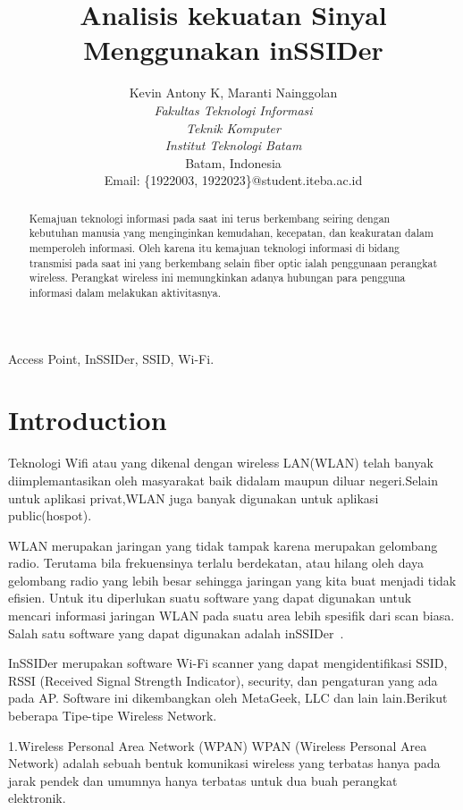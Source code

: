 \documentclass[conference]{IEEEtran}
\title{Analisis kekuatan Sinyal Menggunakan inSSIDer}
\author{Kevin Antony K\IEEEauthorrefmark{1}, Maranti Nainggolan\IEEEauthorrefmark{2}\\
\textit{Fakultas Teknologi Informasi}\\
\textit{Teknik Komputer}\\
\textit{Institut Teknologi Batam}\\
Batam, Indonesia\\
Email: \{\IEEEauthorrefmark{1}1922003, \IEEEauthorrefmark{2}1922023\}@student.iteba.ac.id}
\begin{document}
\maketitle

\begin{abstract} 
        Kemajuan teknologi informasi pada saat ini
terus berkembang seiring dengan kebutuhan manusia yang
menginginkan kemudahan, kecepatan, dan keakuratan dalam
memperoleh informasi. Oleh karena itu kemajuan teknologi
informasi di bidang transmisi pada saat ini yang berkembang
selain fiber optic ialah penggunaan perangkat wireless. Perangkat
wireless ini memungkinkan adanya hubungan para pengguna
informasi dalam melakukan aktivitasnya.
\end{abstract}  


\begin{IEEEkeywords}
Access Point, InSSIDer, SSID, Wi-Fi.
\end{IEEEkeywords}

\section{Introduction}
Teknologi Wifi atau yang dikenal dengan wireless LAN(WLAN) telah banyak diimplemantasikan 
oleh masyarakat baik didalam maupun diluar negeri.Selain untuk aplikasi privat,WLAN 
juga banyak digunakan untuk aplikasi public(hospot).\

\vspace{0.2cm}

WLAN merupakan jaringan yang tidak tampak karena
merupakan gelombang radio. Terutama bila frekuensinya terlalu
berdekatan, atau hilang oleh daya gelombang radio yang
lebih besar sehingga jaringan yang kita buat menjadi tidak
efisien. Untuk itu diperlukan suatu software yang dapat digunakan
untuk mencari informasi jaringan WLAN pada suatu
area lebih spesifik dari scan biasa. Salah satu software yang
dapat digunakan adalah inSSIDer~. \cite{b5}

\vspace{0.2cm}

InSSIDer merupakan software Wi-Fi scanner yang dapat
mengidentifikasi SSID, RSSI (Received Signal Strength Indicator),
security, dan pengaturan yang ada pada AP. Software
ini dikembangkan oleh MetaGeek, LLC dan lain lain.Berikut beberapa Tipe-tipe Wireless Network.\

1.Wireless Personal Area Network (WPAN)
WPAN (Wireless Personal Area Network) adalah sebuah bentuk komunikasi wireless yang terbatas hanya pada jarak pendek dan umumnya hanya terbatas untuk dua buah perangkat elektronik.
\vspace{5pt}
\end{document}
